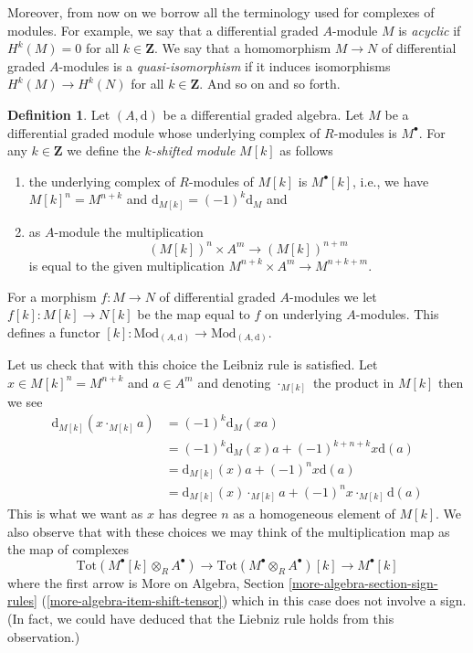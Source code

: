 \documentclass{stacks-project}
\theoremstyle{plain}
\theoremstyle{definition}
\newtheorem{definition}[subsection]{Definition}
\theoremstyle{remark}
\numberwithin{equation}{subsection}
\begin{document}
\medskip\noindent
Moreover, from now on we borrow all the terminology used for
complexes of modules. For example, we say that a differential
graded $A$-module $M$ is {\it acyclic} if $H^k(M) = 0$ for
all $k \in \mathbf{Z}$. We say that a homomorphism $M \to N$
of differential graded $A$-modules is a {\it quasi-isomorphism}
if it induces isomorphisms $H^k(M) \to H^k(N)$ for all $k \in \mathbf{Z}$.
And so on and so forth.

\begin{definition}
\label{definition-shift}
Let $(A, \text{d})$ be a differential graded algebra.
Let $M$ be a differential graded module whose underlying complex
of $R$-modules is $M^\bullet$. For any $k \in \mathbf{Z}$
we define the {\it $k$-shifted module} $M[k]$ as follows
\begin{enumerate}
\item the underlying complex of $R$-modules of $M[k]$ is $M^\bullet[k]$,
i.e., we have $M[k]^n = M^{n + k}$ and
$\text{d}_{M[k]} = (-1)^k\text{d}_M$ and
\item as $A$-module the multiplication
$$
(M[k])^n \times A^m \longrightarrow (M[k])^{n + m}
$$
is equal to the given multiplication $M^{n + k} \times A^m \to M^{n + k + m}$.
\end{enumerate}
For a morphism $f : M \to N$ of differential graded $A$-modules
we let $f[k] : M[k] \to N[k]$ be the map equal to $f$ on underlying
$A$-modules. This defines a functor
$[k] : \text{Mod}_{(A, \text{d})} \to \text{Mod}_{(A, \text{d})}$.
\end{definition}

\noindent
Let us check that with this choice the Leibniz rule is satisfied.
Let $x \in M[k]^n = M^{n + k}$ and $a \in A^m$ and denoting
$\cdot_{M[k]}$ the product in $M[k]$ then we see
\begin{align*}
\text{d}_{M[k]}(x \cdot_{M[k]} a)
& =
(-1)^k \text{d}_M(xa) \\
& =
(-1)^k \text{d}_M(x) a + (-1)^{k + n + k} x \text{d}(a) \\
& =
\text{d}_{M[k]}(x) a + (-1)^n x \text{d}(a) \\
& =
\text{d}_{M[k]}(x) \cdot_{M[k]} a + (-1)^n x \cdot_{M[k]} \text{d}(a)
\end{align*}
This is what we want as $x$ has degree $n$ as a homogeneous element of $M[k]$.
We also observe that with these choices we may think of
the multiplication map as the map of complexes
$$
\text{Tot}(M^\bullet[k] \otimes _R A^\bullet) \to
\text{Tot}(M^\bullet \otimes _R A^\bullet)[k] \to
M^\bullet[k]
$$
where the first arrow is
More on Algebra, Section \ref{more-algebra-section-sign-rules}
(\ref{more-algebra-item-shift-tensor}) which in this
case does not involve a sign. (In fact, we could have deduced
that the Liebniz rule holds from this observation.)
\end{document}
